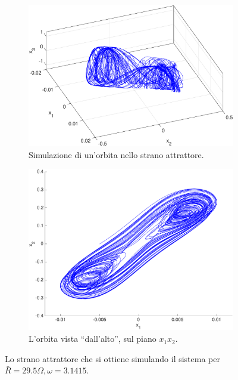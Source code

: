 \begin{figure}
    \centering
    \begin{subfigure}{\textwidth}
        \includegraphics[width=\textwidth]{matcont/StranoAttrattore}
        \caption{Simulazione di un'orbita nello strano attrattore.}
    \end{subfigure}
    \par\bigskip
    \begin{subfigure}{0.85\textwidth}
        \includegraphics[width=\textwidth]{matcont/StranoAttrattore2D}
        \caption{L'orbita vista ``dall'alto'', sul piano $x_1 x_2$.}
    \end{subfigure}
    \caption{Lo strano attrattore che si ottiene simulando il sistema per $\bar{R}=29.5 \Omega, \omega = 3.1415$.}
    \label{fig:strano-attrattore}
\end{figure}
